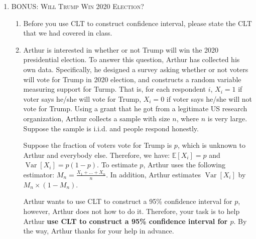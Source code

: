 \documentclass[11pt,letterpaper]{article}
\newtheorem{theorem}{Theorem}[section]
\DeclareMathOperator*{\var}{Var}
\theoremstyle{definition}
\numberwithin{equation}{section}
\begin{document}
\begin{enumerate}[I]
\begin{enumerate}[1)]
\begin{enumerate}
\end{enumerate}




\end{enumerate}

\pagebreak

\item \textsc{BONUS: Will Trump Win 2020 Election?} 

\begin{enumerate}
	
	\item Before you use CLT to construct confidence interval, please state the CLT that we had covered in class.
\bigskip
    \item Arthur is interested in whether or not Trump will win the 2020 presidential election. To answer this question, Arthur has collected his own data. Specifically, he designed a survey asking whether or not voters will vote for Trump in 2020 election, and constructs a random variable measuring support for Turmp.  That is, for each respondent $i$, $X_{i} = 1$ if voter says he/she will vote for Trump, $X_{i} = 0$ if voter says he/she will not vote for Trump. Using a grant that he got from a legitimate US research organization, Arthur collects a sample with size $n$, where $n$ is very large. Suppose the sample is i.i.d. and people respond honestly.
    
    Suppose the fraction of voters vote for Trump is $p$, which is unknown to Arthur and everybody else. Therefore, we have: $\mathbb{E}[X_{i}] = p$ and $\var[X_{i}] = p (1 - p)$. To estimate $p$, Arthur uses the following estimator: $M_{n} = \frac{X_{1} + ... + X_{n}}{n}$. In addition, Arthur estimates $\var[X_{i}]$ by $M_{n} \times (1 - M_{n})$.
    
    Arthur wants to use CLT to construct a 95\% confidence interval for $p$, however, Arthur does not how to do it. Therefore, your task is to help Arthur \textbf{use CLT to construct a 95\% confidence interval for $p$}. By the way, Arthur thanks for your help in advance.
    

\end{enumerate}
\end{enumerate}
\end{document}
